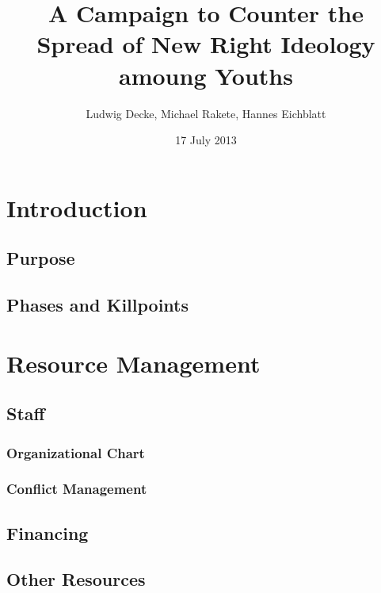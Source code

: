 \documentclass{beamer}
\title{A Campaign to Counter the Spread of New Right Ideology amoung Youths}
\institute{English in Project Management \\ Sprachenzentrum der Universität Leipzig}
\author{Ludwig Decke, Michael Rakete, Hannes Eichblatt}
\date{17 July 2013}
\begin{document}
\frame[plain]{\maketitle}

\section{Introduction}

\subsection{Purpose}

\begin{frame}
\end{frame}

\subsection{Phases and Killpoints}

\begin{frame}
\end{frame}

\section{Resource Management}

\subsection{Staff}

\begin{frame}
\frametitle{Organizational Chart}
\end{frame}

\begin{frame}
\frametitle{Conflict Management}
\end{frame}

\subsection{Financing}

\begin{frame}
\end{frame}

\subsection{Other Resources}
\end{document}
